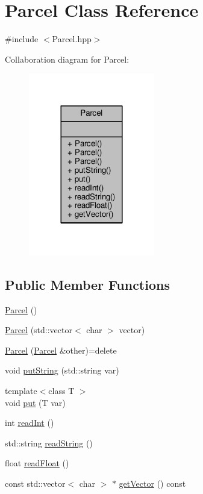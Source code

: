 \hypertarget{class_parcel}{\section{Parcel Class Reference}
\label{class_parcel}
}


{\ttfamily \#include $<$Parcel.\-hpp$>$}



Collaboration diagram for Parcel\-:
\nopagebreak
\begin{figure}[H]
\begin{center}
\leavevmode
\includegraphics[width=156pt]{class_parcel__coll__graph}
\end{center}
\end{figure}
\subsection*{Public Member Functions}
\begin{DoxyCompactItemize}
\item 
\hyperlink{class_parcel_a80bc44e52660817288138bc3e8eeb913}{Parcel} ()
\item 
\hyperlink{class_parcel_af4041109946826da335989a6554153e0}{Parcel} (std\-::vector$<$ char $>$ vector)
\item 
\hyperlink{class_parcel_a75b0f276e47657edb2cc4f51d571158e}{Parcel} (\hyperlink{class_parcel}{Parcel} \&other)=delete
\item 
void \hyperlink{class_parcel_a0b164ec23965e3f37dd8a0d99321e232}{put\-String} (std\-::string var)
\item 
{\footnotesize template$<$class T $>$ }\\void \hyperlink{class_parcel_a19b5c8e0abaec80ea10da49d0832ad5b}{put} (T var)
\item 
int \hyperlink{class_parcel_a4540d13bf8699f6f3bcafd9e95bce706}{read\-Int} ()
\item 
std\-::string \hyperlink{class_parcel_ad0d3b72bb1ca2319bab9a1981f60cd53}{read\-String} ()
\item 
float \hyperlink{class_parcel_aea33f46c6e77dd0c297e1ef5fdf5973e}{read\-Float} ()
\item 
const std\-::vector$<$ char $>$ $\ast$ \hyperlink{class_parcel_ad76fa40dc5cf6ede93b627f3f4845176}{get\-Vector} () const 
\end{DoxyCompactItemize}


